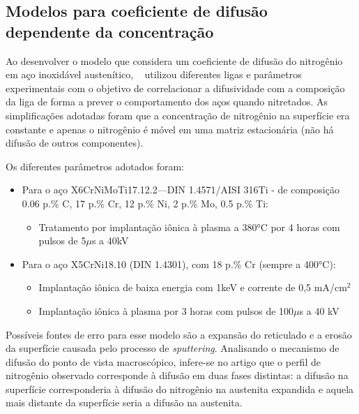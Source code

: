 \documentclass[]{politex}
\begin{document}
\subsection{Modelos para coeficiente de difusão dependente da concentração}
\label{sec:concdep}
	Ao desenvolver o modelo que considera um coeficiente de difusão do nitrogênio em aço inoxidável austenítico, ~\cite{mandl2003nitrogen} utilizou diferentes ligas e parâmetros experimentais com o objetivo de correlacionar a difusividade com a composição da liga de forma a prever o comportamento dos aços quando nitretados. As simplificações adotadas foram que a concentração de nitrogênio na superfície era constante e apenas o nitrogênio é móvel em uma matriz estacionária (não há difusão de outros componentes).\par
	Os diferentes parâmetros adotados foram:
	\begin{itemize}
	 \item Para o aço X6CrNiMoTi17.12.2—DIN 1.4571/AISI 316Ti - de composição 0.06 p.\% C, 17 p.\% Cr, 12 p.\% Ni, 2 p.\% Mo, 0.5 p.\% Ti:
		\begin{itemize}
		 \item Tratamento por implantação iônica à plasma a 380°C por 4 horas com pulsos de 5$\mu$s a 40kV
		\end{itemize}
	 \item Para o aço X5CrNi18.10 (DIN 1.4301), com 18 p.\% Cr (sempre a 400°C):
		\begin{itemize}
		 \item Implantação iônica de baixa energia com 1keV e corrente de 0,5 mA/cm$^2$
		 \item Implantação iônica à plasma por 3 horas com pulsos de 100$\mu$s a 40 kV
		\end{itemize} 
	\end{itemize}
	Possíveis fontes de erro para esse modelo são a expansão do reticulado e a erosão da superfície causada pelo processo de \textit{sputtering}.
	Analisando o mecanismo de difusão do ponto de vista macroscópico, infere-se no artigo que o perfil de nitrogênio observado corresponde à difusão em duas fases distintas: a difusão na superfície corresponderia à difusão do nitrogênio na austenita expandida e aquela mais distante da superfície seria a difusão na austenita.\par
\end{document}
